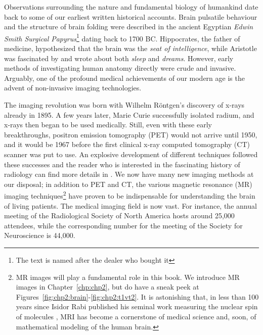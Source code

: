 %
%

\preface

Observations surrounding the nature and fundamental biology of
humankind date back to some of our earliest written historical
accounts.  Brain pulsatile behaviour and the structure of brain
folding were described in the ancient Egyptian \textit{Edwin Smith
Surgical Papyrus}\footnote{The text is named after the dealer who
bought it} dating back to 1700 BC.  Hippocrates, the father of
medicine, hypothesized that the brain was the \textit{seat of
intelligence}, while Aristotle was fascinated by and wrote about
both \textit{sleep} and \textit{dreams}. However, early methods of
investigating human anatomy directly were crude and invasive.
Arguably, one of the profound medical achievements of our modern age
is the advent of non-invasive imaging technologies.

The imaging revolution was born with Wilhelm R{\"o}ntgen's discovery of
x-rays already in 1895. A few years later, Marie Curie successfully
isolated radium, and x-rays then began to be used medically. Still,
even with these early breakthroughs, positron emission tomography
(PET) would not arrive until 1950, and it would be 1967 before the
first clinical x-ray computed tomography (CT) scanner was put to use.
An explosive development of different techniques followed these
successes and the reader who is interested in the fascinating history of 
radiology can find more details in \cite{thomas2013}.  We now have many new 
imaging methods at our disposal; in addition to PET and CT, the various 
magnetic resonance (MR) imaging techniques\footnote{MR images will play a 
fundamental role in this book.  We introduce MR images in 
Chapter~\ref{chp:chp2}, but do have a sneak peek at 
Figures~\ref{fig:chp2:brain}-\ref{fig:chp2:t1vt2}.  It is astonishing that, 
in less than 100 years since Isidor Rabi published his seminal work measuring 
the nuclear spin of molecules \cite{thomas2013}, MRI has become a cornerstone 
of medical science and, soon, of mathematical modeling of the human brain.     
} have proven to be indispensable for 
understanding the brain of living patients. The medical imaging field is now 
vast. For instance, the annual meeting of the Radiological Society of North
America hosts around 25,000 attendees, while the corresponding number
for the meeting of the Society for Neuroscience is 44,000.  

